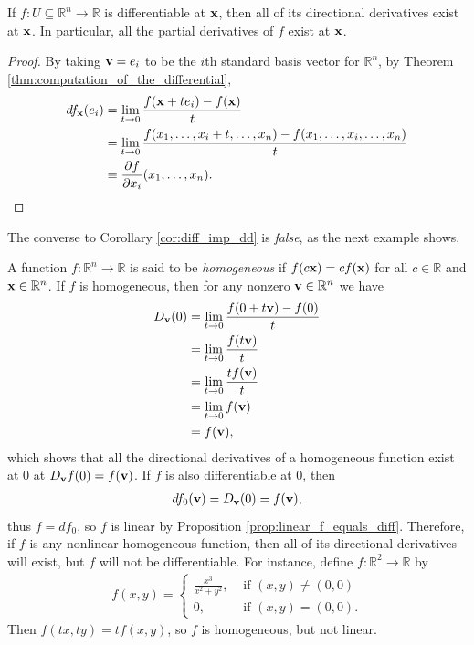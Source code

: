 \documentclass[12pt,letterpaper,reqno]{article}
\numberwithin{equation}{section}
\newcommand{\R}{\ensuremath{\mathbb R}}
\newcommand{\bv}{{\bf v}}
\newcommand{\bx}{{\bf x}}
\begin{document}
{\begin{cor}\label{cor:diff_imp_dd}
If $f:U \subseteq \R^n \to \R$ is differentiable at $\bx$, then all of its directional derivatives exist at $\bx$. In particular, all the partial derivatives of $f$ exist at $\bx$.	
\end{cor}

\begin{proof}
	By taking $\bv=e_i$ to be the $i$th standard basis vector for $\R^n$, by Theorem \ref{thm:computation_of_the_differential},
	\begin{align*}
		df_\bx(e_i)&=\lim_{t \to 0}\frac{f(\bx+te_i)-f(\bx)}{t}\\
		&=\lim_{t \to 0}\frac{f(x_1,\dots,x_i+t,\dots,x_n)-f(x_1,\dots,x_i,\dots,x_n)}{t}\\
		&\equiv \frac{\partial f}{\partial x_i}(x_1,\dots,x_n).
	\end{align*}
\end{proof}

The converse to Corollary \ref{cor:diff_imp_dd} is \emph{false}, as the next example shows.

\begin{example}
	A function $f:\R^n \to \R$ is said to be \emph{homogeneous} if $f(c\bx)=cf(\bx)$ for all $c \in \R$ and $\bx \in \R^n$. If $f$ is homogeneous, then for any nonzero $\bv \in \R^n$ we have
	\begin{align*}
		D_\bv(0)&=\lim_{t \to 0}\frac{f(0+t\bv)-f(0)}{t}\\
		&=\lim_{t \to 0}\frac{f(t\bv)}{t}\\
		&=\lim_{t \to 0}\frac{tf(\bv)}{t}\\
		&=\lim_{t \to 0}f(\bv)\\
		&=f(\bv),
	\end{align*}
	which shows that all the directional derivatives of a homogeneous function exist at 0 at $D_\bv f(0)=f(\bv)$. If $f$ is also differentiable at $0$, then
	\begin{align*}
		df_0(\bv)=D_\bv(0)=f(\bv),
	\end{align*}
thus $f=df_0$, so $f$ is linear by Proposition \ref{prop:linear_f_equals_diff}. Therefore, if $f$ is any nonlinear homogeneous function, then all of its directional derivatives will exist, but $f$ will not be differentiable. For instance, define $f:\R^2 \to \R$ by
\begin{align*}
	f(x,y)=\begin{cases}
		\frac{x^3}{x^2+y^2}, &\text{ if } (x,y)
 \neq (0,0) \\
 0, &\text{ if } (x,y)=(0,0).
 	\end{cases}
\end{align*} 
Then $f(tx,ty)=tf(x,y)$, so $f$ is homogeneous, but not linear.
\end{example}

}
\end{document}
